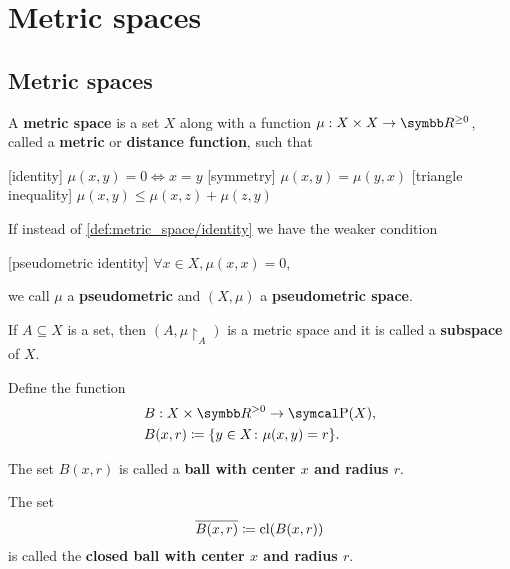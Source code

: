 \section{Metric spaces}\label{sec:metric_spaces}
\subsection{Metric spaces}\label{subsec:metric_spaces}

\begin{definition}\label{def:metric_space}\cite[248]{Engelking1989}
  A \textbf{metric space} is a set \( X \) along with a function \( \mu: X \times X \to \BB{R}^{\geq 0} \), called a \textbf{metric} or \textbf{distance function}, such that
  \begin{description}
    [identity] \( \mu(x, y) = 0 \iff x = y \)
    [symmetry] \( \mu(x, y) = \mu(y, x) \)
    [triangle inequality] \( \mu(x, y) \leq \mu(x, z) + \mu(z, y) \)
  \end{description}

  If instead of \ref{def:metric_space/identity} we have the weaker condition
  \begin{description}
    [pseudometric identity] \( \forall x \in X, \mu(x, x) = 0 \),
  \end{description}
  we call \( \mu \) a \textbf{pseudometric} and \( (X, \mu) \) a \textbf{pseudometric space}.

  \begin{defenum}
     If \( A \subseteq X \) is a set, then \( (A, \mu{\restriction_A}) \) is a metric space and it is called a \textbf{subspace} of $X$.

     Define the function
    \begin{align*}
      &B: X \times \BB{R}^{>0} \to \Power(X), \\
      &B(x, r) \coloneqq \{ y \in X \colon \mu(x, y) = r \}.
    \end{align*}

    The set \( B(x, r) \) is called a \textbf{ball with center \( x \) and radius \( r \)}.

     The set
    \begin{equation*}
      \overline{B(x, r)} \coloneqq \operatorname{cl}(B(x, r))
    \end{equation*}
    is called the \textbf{closed ball with center \( x \) and radius \( r \)}.


\end{defenum}
\end{definition}
